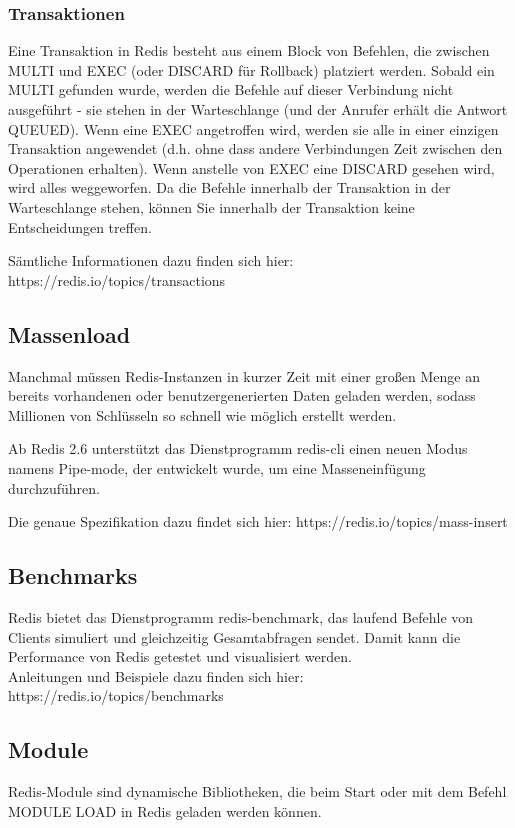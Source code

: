 \subsubsection{Transaktionen}
Eine Transaktion in Redis besteht aus einem Block von Befehlen, die zwischen MULTI und EXEC (oder DISCARD für Rollback) platziert werden. Sobald ein MULTI gefunden wurde, werden die Befehle auf dieser Verbindung nicht ausgeführt - sie stehen in der Warteschlange (und der Anrufer erhält die Antwort QUEUED). Wenn eine EXEC angetroffen wird, werden sie alle in einer einzigen Transaktion angewendet (d.h. ohne dass andere Verbindungen Zeit zwischen den Operationen erhalten). Wenn anstelle von EXEC eine DISCARD gesehen wird, wird alles weggeworfen. Da die Befehle innerhalb der Transaktion in der Warteschlange stehen, können Sie innerhalb der Transaktion keine Entscheidungen treffen.

Sämtliche Informationen dazu finden sich hier: https://redis.io/topics/transactions

\subsection{Massenload}
Manchmal müssen Redis-Instanzen in kurzer Zeit mit einer großen Menge an bereits vorhandenen oder benutzergenerierten Daten geladen werden, sodass Millionen von Schlüsseln so schnell wie möglich erstellt werden.

Ab Redis 2.6 unterstützt das Dienstprogramm redis-cli einen neuen Modus namens Pipe-mode, der entwickelt wurde, um eine Masseneinfügung durchzuführen.

Die genaue Spezifikation dazu findet sich hier: https://redis.io/topics/mass-insert

\subsection{Benchmarks}
Redis bietet das Dienstprogramm redis-benchmark, das laufend Befehle von Clients simuliert und gleichzeitig Gesamtabfragen sendet. Damit kann die Performance von Redis getestet und visualisiert werden.\\
Anleitungen und Beispiele dazu finden sich hier: https://redis.io/topics/benchmarks

\subsection{Module}
Redis-Module sind dynamische Bibliotheken, die beim Start oder mit dem Befehl MODULE LOAD in Redis geladen werden können.

